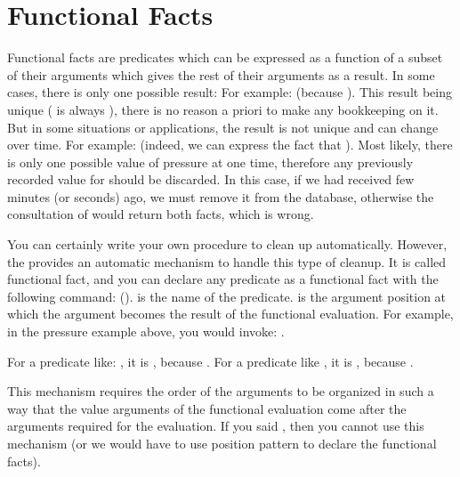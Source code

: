 \section{Functional Facts}

Functional facts are predicates which can be expressed as a function of a
subset of their arguments which gives the rest of their arguments as a result.
In some cases, there is only one possible result: \* For example:
 (because ).  This result
being unique ( is always ), there is no reason a
priori to make any bookkeeping on it. But in some situations or applications,
the result is not unique and can change over time.  For example: \*
 (indeed, we can express the fact that
). \* Most likely, there is only one possible value
of pressure at one time, therefore any previously recorded value for 
should be discarded. In this case, if we had received 
few minutes (or seconds) ago, we must remove it from the database, otherwise
the consultation of  would return both facts, which is
wrong.

You can certainly write your own procedure to clean up automatically.
However, the \CPK{} provides an automatic mechanism to handle this type of
cleanup. It is called functional fact, and you can declare any predicate
as a functional fact with the following command:  ().
 is the name of the predicate.  is the
argument position at which the argument becomes the result of the
functional evaluation. For example, in the pressure example above, you
would invoke: .

For a predicate like: \*
,\*
it is \*
,\*
because \*
. \*
For a predicate like \*
,\*
it is \*
,\*
because \*
.

This mechanism requires the order of the arguments to be organized in such
a way that the value arguments of the functional evaluation come after
the arguments required for the evaluation. If you said
, then you cannot use this mechanism (or we would
have to use position pattern to declare the functional facts).

